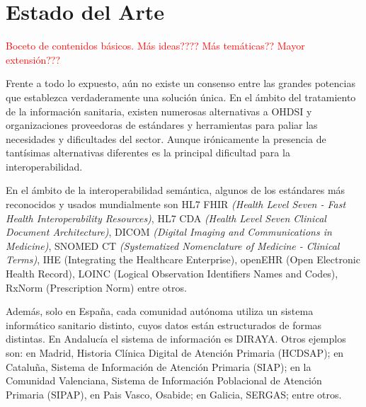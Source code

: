 \section{Estado del Arte} \label{sec:01EstadoArte} 

\textcolor{red}{Boceto de contenidos básicos. Más ideas???? Más temáticas?? Mayor extensión???}


Frente a todo lo expuesto, aún no existe un consenso entre las grandes potencias que establezca verdaderamente una solución única. En el ámbito del tratamiento de la información sanitaria, existen numerosas alternativas a OHDSI y organizaciones proveedoras de estándares y herramientas para paliar las necesidades y dificultades del sector. Aunque irónicamente la presencia de tantísimas alternativas diferentes es la principal dificultad para la interoperabilidad.

En el ámbito de la interoperabilidad semántica, algunos de los estándares más reconocidos y usados mundialmente son HL7 FHIR \textit{(Health Level Seven - Fast Health Interoperability Resources)}, HL7 CDA \textit{(Health Level Seven Clinical Document Architecture)}, DICOM \textit{(Digital Imaging and Communications in Medicine)}, SNOMED CT \textit{(Systematized Nomenclature of Medicine - Clinical Terms)}, IHE (Integrating the Healthcare Enterprise), openEHR (Open Electronic Health Record), LOINC (Logical Observation Identifiers Names and Codes), RxNorm (Prescription Norm) entre otros.

Además, solo en España, cada comunidad autónoma utiliza un sistema informático sanitario distinto, cuyos datos están estructurados de formas distintas. En Andalucía el sistema de información es DIRAYA. Otros ejemplos son: en Madrid, Historia Clínica Digital de Atención Primaria (HCDSAP); en Cataluña, Sistema de Información de Atención Primaria (SIAP); en la Comunidad Valenciana, Sistema de Información Poblacional de Atención Primaria (SIPAP), en Pais Vasco, Osabide; en Galicia, SERGAS; entre otros.

